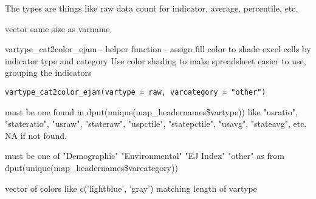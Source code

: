 \documentclass[a4paper]{book}
\begin{document}
%
\begin{Details}\relax
The types are things like raw data count for indicator, average, percentile, etc.
\end{Details}
%
\begin{Value}
vector same size as varname
\end{Value}
%
\begin{SeeAlso}\relax
{} 
\end{SeeAlso}
%
\begin{Description}\relax
vartype\_cat2color\_ejam - helper function - assign fill color to shade excel cells by indicator type and category
Use color shading to make spreadsheet easier to use, grouping the indicators
\end{Description}
%
\begin{Usage}
\begin{verbatim}
vartype_cat2color_ejam(vartype = raw, varcategory = "other")
\end{verbatim}
\end{Usage}
%
\begin{Arguments}
\begin{ldescription}
\item[\code{vartype}] must be one found in dput(unique(map\_headernames\$vartype))
like "usratio", "stateratio", "usraw", "stateraw",
"uspctile", "statepctile", "usavg", "stateavg", etc.
NA if not found.

\item[\code{varcategory}] must be one of "Demographic"   "Environmental" "EJ Index" "other"
as from dput(unique(map\_headernames\$varcategory))
\end{ldescription}
\end{Arguments}
%
\begin{Value}
vector of colors like c('lightblue', 'gray') matching length of vartype
\end{Value}
%
\begin{SeeAlso}\relax
{}   
\end{SeeAlso}
\end{document}

